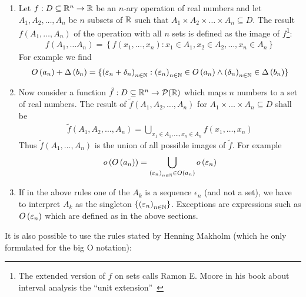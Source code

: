 \begin{enumerate}
  \item Let $f:D\subseteq\mathbb R^n\to\mathbb R$ be an $n$-ary operation of real numbers and let $A_1,A_2,\ldots,A_n$ be $n$ subsets of $\mathbb R$ such that $A_1\times A_2\times \dots\times A_n\subseteq D$. The result  $f\left(A_1,\ldots,A_n\right)$ of the operation with all $n$ sets is defined as the image of $f$\footnote{The extended version of $f$ on sets calls Ramon E. Moore in his book about interval analysis the ``unit extension''~\cite[p. 18]{moore}}:
\begin{align}
  f\left(A_1,\ldots A_n\right)=\left\{f(x_1,\ldots,x_n):x_1\in A_1,x_2\in A_2,\ldots,x_n\in A_n\right\}
\end{align}
  For example we find
  \begin{align}
    O\left( {a_n} \right) + \Delta\left( {b_n} \right) = \{ \left({\varepsilon_n+\delta_n}\right)_{{n}\in\mathbb N} : \left({\varepsilon_n}\right)_{{n}\in\mathbb N}\in O\left( {a_n} \right) \land \left({\delta_n}\right)_{{n}\in\mathbb N}\in\Delta\left( {b_n} \right)\}
  \end{align}

  \item Now consider a function $\tilde f:D\subseteq\mathbb R^n\to \mathcal P(\mathbb R)$ which maps $n$ numbers to a set of real numbers. The result of $\tilde f\left(A_1,A_2,\ldots,A_n\right)$ for $A_1\times\dots\times A_n\subseteq D$ shall be
\begin{align}
  \tilde f\left(A_1,A_2,\ldots,A_n\right) = \bigcup_{x_1\in A_1, \ldots, x_n \in A_n} f(x_1,\ldots,x_n)
\end{align}
Thus $\tilde f(A_1,\ldots,A_n)$ is the union of all possible images of $\tilde f$. For example
\begin{align}
  o\left( {O\left( {a_n} \right)} \right) = \bigcup_{\left({\varepsilon_n}\right)_{{n}\in\mathbb N}\in O\left( {a_n} \right)} o\left( {\varepsilon_n} \right)
\end{align}

  \item If in the above rules one of the $A_k$ is a sequence $\epsilon_n$ (and not a set), we have to interpret $A_k$ as the singleton $\{\left({\varepsilon_n}\right)_{{n}\in\mathbb N}\}$. Exceptions are expressions such as $O\left( {\varepsilon_n} \right)$ which are defined as in the above sections.
\end{enumerate}

It is also possible to use the rules stated by Henning Makholm\cite{bigo_rules2} (which he only formulated for the big O notation):

